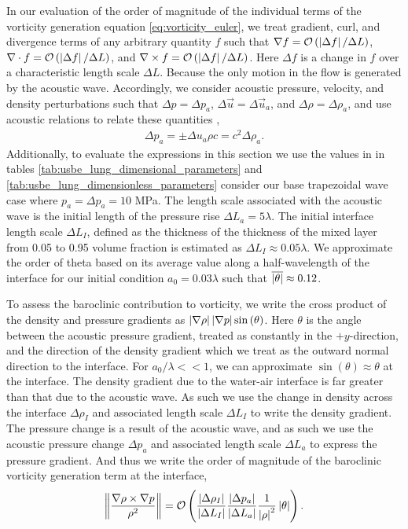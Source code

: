 In our evaluation of the order of magnitude of the individual terms of
the vorticity generation equation \eqref{eq:vorticity_euler}, we treat
gradient, curl, and divergence terms of any arbitrary quantity $f$
such that $\nabla f= \mathcal{O}\left(\left|\Delta f\right|/\Delta L\right)$,
$\nabla\cdot f=\mathcal{O}\left(\left|\Delta f\right|/\Delta L\right)$, and
$\nabla\times f=\mathcal{O}\left(\left|\Delta f\right|/\Delta L\right)$. Here
$\Delta f$ is a change in $f$ over a characteristic length scale
$\Delta L$. Because the only motion in the flow is generated by the
acoustic wave. Accordingly, we consider acoustic pressure, velocity,
and density perturbations such that $\Delta p=\Delta p_a$,
$\Delta \vec{u}=\Delta \vec{u}_a$, and $\Delta \rho=\Delta \rho_a$,
and use acoustic relations to relate these quantities
\citep{Anderson1990},
\begin{align}%
  \label{eq:acoustic_relations}%
  \Delta p_a=\pm\Delta u_a \rho c=c^2\Delta \rho_a.%
\end{align}
Additionally, to evaluate the expressions in this section we use the
values in in tables \ref{tab:usbe_lung_dimensional_parameters} and
\ref{tab:usbe_lung_dimensionless_parameters} consider our base
trapezoidal wave case where $p_a = \Delta p_a = 10$ MPa. The length
scale associated with the acoustic wave is the initial length of the
pressure rise $\Delta L_a=5\lambda$. The initial interface length
scale $\Delta L_I$, defined as the thickness of the thickness of the
mixed layer from 0.05 to 0.95 volume fraction is estimated as
$\Delta L_I \approx 0.05\lambda$. We approximate the order of theta
based on its average value along a half-wavelength of the interface
for our initial condition $a_0=0.03\lambda$ such that
$\overline{\left|\theta\right|}\approx0.12$.

To assess the baroclinic contribution to vorticity, we write the cross
product of the density and pressure gradients as
$\left|\nabla \rho\right| \left|\nabla p\right| \sin{\left(\theta\right)}$. Here
$\theta$ is the angle between the acoustic pressure gradient, treated
as constantly in the $\plus y$-direction, and the direction of the
density gradient which we treat as the outward normal direction to the
interface. For $a_0/\lambda<<1$, we can approximate
$\sin{\left(\theta\right)}\approx\theta$ at the interface. The density
gradient due to the water-air interface is far greater than that due
to the acoustic wave. As such we use the change in density across the
interface $\Delta \rho_I$ and associated length scale $\Delta L_I$ to
write the density gradient. The pressure change is a result of the
acoustic wave, and as such we use the acoustic pressure change
$\Delta p_a$ and associated length scale $\Delta L_a$ to express the
pressure gradient. And thus we write the order of magnitude of the
baroclinic vorticity generation term at the interface,
\begin{align}
  \label{eq:baroclinic_vorticity}%
  \norm{\frac{\nabla\rho\times\nabla p}{\rho^2}} = \orderof{\frac{\abs{\Delta \rho_I}}{\abs{\Delta L_I}}\frac{\abs{\Delta p_a}}{\abs{\Delta L_a}}\frac{1}{\abs{\rho}^2}\abs{\theta}}.%
\end{align}

